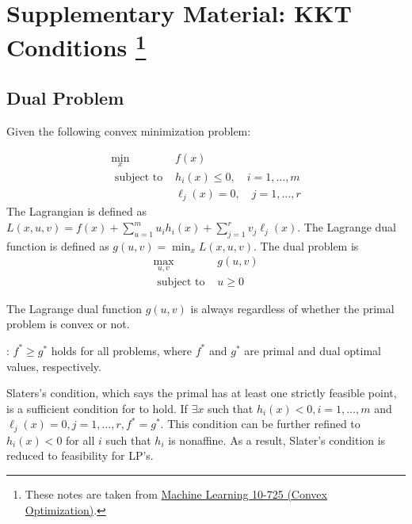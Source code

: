 \section[Supplementary Material: KKT Conditions ]{Supplementary Material: KKT Conditions \footnote{These notes are taken from \href{https://www.stat.cmu.edu/~ryantibs/convexopt/}{Machine Learning 10-725 (Convex Optimization)}.}}


\subsection{Dual Problem}

Given the following convex minimization problem:

\begin{problem}
    \label{pro:kkt-problem}
    \begin{equation}
\begin{array}{ll}
\min _{x} & f(x) \\
\text { subject to } & h_{i}(x) \leq 0, \quad i=1, \ldots, m \\
& \ell_{j}(x)=0, \quad j=1, \ldots, r
\end{array}
\end{equation}
The Lagrangian is defined as $ L(x, u, v)=f(x)+\sum_{u=1}^{m} u_{i} h_{i}(x)+\sum_{j=1}^{r} v_{j} \ell_{j}(x) . $ The Lagrange dual function is defined as $ g(u, v)=\min _{x} L(x, u, v) $. The dual problem is
\begin{equation}
\begin{array}{ll}
\max _{u, v} & g(u, v) \\
\text { subject to } & u \geq 0
\end{array}
\end{equation}
\end{problem}


The Lagrange dual function $ g(u, v) $ is always  regardless of whether the primal problem is convex or not.

: $ f^{*} \geq g^{*} $ holds for all problems, where $ f^{*} $ and $ g^{*} $ are primal and dual optimal values, respectively.

Slaters's condition, which says the primal has at least one strictly feasible point, is a sufficient condition for  to hold. If $ \exists x $ such that $ h_{i}(x)<0, i=1, \ldots, m $ and $ \ell_{j}(x)=0, j=1, \ldots, r, f^{*}=g^{*} $. This condition can be further refined to $ h_{i}(x)<0 $ for all $ i $ such that $ h_{i} $ is nonaffine. As a result, Slater's condition is reduced to feasibility for LP's.

